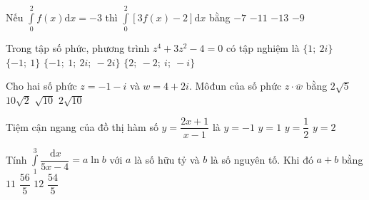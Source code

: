 \begin{ex}%
	Nếu $\displaystyle\int\limits_{0}^{2} f(x)\mathrm{d}x=-3$ thì $\displaystyle\int\limits_{0}^{2} \left[3f(x)-2\right]\mathrm{d}x$ bằng
	\choice
	{$-7$}
	{$-11$}
	{\True $-13$}
	{$-9$}
\end{ex}

\begin{ex}%
	Trong tập số phức, phương trình $z^4+3z^2-4=0$ có tập nghiệm là
	\choice
	{$\{1;\ 2i\}$}
	{$\{-1;\ 1\}$}
	{\True $\{-1;\ 1;\ 2i;\ -2i\}$}
	{$\{2;\ -2;\ i;\ -i \}$}
\end{ex}

\begin{ex}%
	Cho hai số phức $z=-1-i$ và $w=4+2i$. Môđun của số phức $z\cdot\overline{w}$ bằng
	\choice
	{$2\sqrt{5}$}
	{$10\sqrt{2}$}
	{$\sqrt{10}$}
	{\True $2\sqrt{10}$}
\end{ex}

\begin{ex}%
	Tiệm cận ngang của đồ thị hàm số $y=\dfrac{2x+1}{x-1}$ là
	\choice
	{$y=-1$}
	{$y=1$}
	{$y=\dfrac{1}{2}$}
	{\True $y=2$}
\end{ex}

\begin{ex}%
	Tính $\displaystyle\int\limits_1^3\dfrac{\mathrm{\,d}x}{5x-4}=a\ln b$ với $a$ là số hữu tỷ và $b$ là số nguyên tố. Khi đó $a+b$ bằng
	\choice
	{$11$}
	{\True $\dfrac{56}{5}$}
	{$12$}
	{$\dfrac{54}{5}$}
\end{ex}

